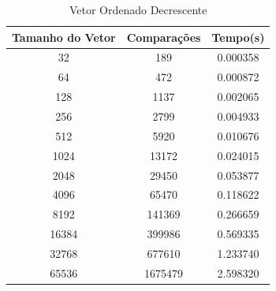 \documentclass[12pt,a4paper,twoside]{report}
\begin{document}
\begin{table}[h]
  \centering
  \caption{Vetor Ordenado Decrescente \label{tab:od}}
  \begin{tabular}{ccc} \\\hline
  \textbf{Tamanho do Vetor} & \textbf{Comparações} & \textbf{Tempo(s)} \\\hline
  32                        & 189                  & 0.000358\\\hline
  64                        & 472                  & 0.000872
\\\hline
  128                       & 1137                 & 0.002065\\\hline
  256                       & 2799                & 0.004933\\\hline
  512                       & 5920                & 0.010676
\\\hline
  1024                      & 13172               & 0.024015\\\hline
  2048                      & 29450       		 & 0.053877          \\\hline
  4096                      & 65470			 & 0.118622         \\\hline
  8192                      & 141369              & 0.266659\\\hline
  16384                     & 399986             & 0.569335\\\hline
  32768                     & 677610             & 1.233740\\\hline
  65536                     & 1675479			& 2.598320
\\\hline
  \end{tabular}
\end{table}
\end{document}
